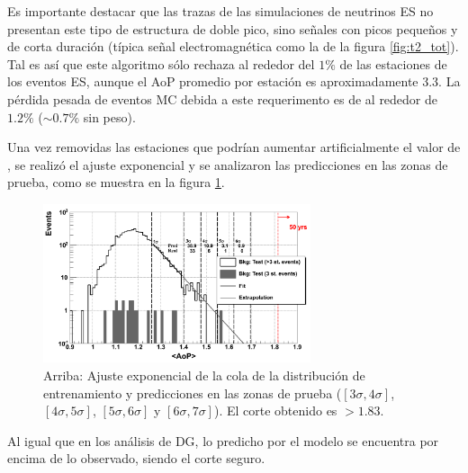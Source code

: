 	Es importante destacar que las trazas de las simulaciones de neutrinos ES no presentan este tipo de estructura de doble pico, sino señales con picos pequeños y de corta duración (típica señal electromagnética como la de la figura \ref{fig:t2_tot}).
	Tal es así que este algoritmo sólo rechaza al rededor del $1\%$ de las estaciones de los eventos ES, aunque el AoP promedio por estación es aproximadamente 3.3.
	La pérdida pesada de eventos MC debida a este requerimento es de al rededor de $1.2\%$ ($\sim 0.7\%$ sin peso).
	
	Una vez removidas las estaciones que podrían aumentar artificialmente el valor de \aop{}, se realizó el ajuste exponencial y se analizaron las predicciones en las zonas de prueba, como se muestra en la figura \ref{fig:fitExpoES}.
	\begin{figure}[ht]
	\begin{center}
	\includegraphics[width=0.7\textwidth]{fig/seleccionAuger/fitExponential_test_with3st_forThesis}
	\caption{Arriba: Ajuste exponencial de la cola de la distribución de entrenamiento y predicciones en las zonas de prueba ($[3\sigma,4\sigma]$, $[4\sigma,5\sigma]$, $[5\sigma,6\sigma]$ y $[6\sigma,7\sigma]$). El corte obtenido es \aop{}$>1.83$.}
	\label{fig:fitExpoES}
	\end{center}
	\end{figure}
	Al igual que en los análisis de DG, lo predicho por el modelo se encuentra por encima de lo observado, siendo el corte seguro.
	
